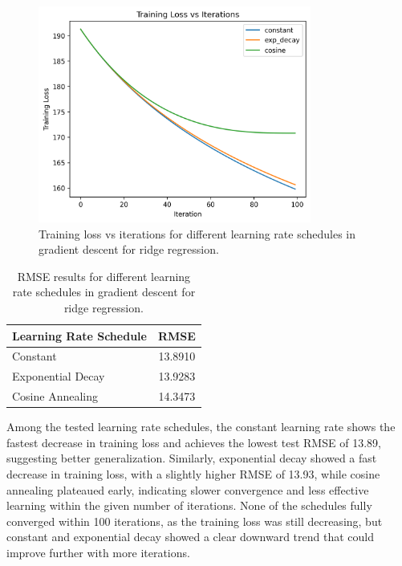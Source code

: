 \documentclass[11pt, a4paper]{article}
\begin{document}
\begin{figure}[H]
    \centering
    \includegraphics[width=0.8\textwidth]{./assets/training_loss_comparison.png}
    \caption{Training loss vs iterations for different learning rate schedules in gradient descent for ridge regression.}
    \label{fig:training_loss_comparison}
\end{figure}

\begin{table}[h!]
\centering
\begin{tabular}{|l|c|}
\hline
\textbf{Learning Rate Schedule} & \textbf{RMSE} \\
\hline
Constant & 13.8910 \\
\hline
Exponential Decay & 13.9283 \\
\hline
Cosine Annealing & 14.3473 \\
\hline
\end{tabular}
\caption{RMSE results for different learning rate schedules in gradient descent for ridge regression.}
\label{tab:learning_rate_schedules}
\end{table}

Among the tested learning rate schedules, the constant learning rate shows the fastest decrease in training 
loss and achieves the lowest test RMSE of 13.89, suggesting better generalization. Similarly, exponential decay showed 
a fast decrease in training loss, with a slightly higher RMSE of 13.93, while cosine annealing plateaued early, indicating slower
convergence and less effective learning within the given number of iterations. None of the schedules fully converged 
within 100 iterations, as the training loss was still decreasing, but constant and exponential decay showed a 
clear downward trend that could improve further with more iterations.
\end{document}
